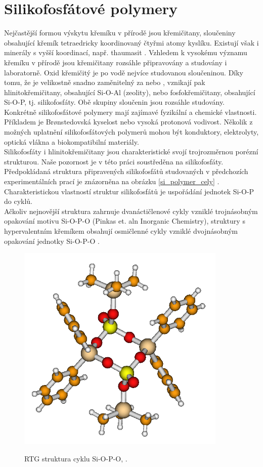 \documentclass[
  digital, %
  table,   %
  lof,     %
  lot,     %
  oneside,
]{fithesis3}
\begin{document}
\section{Silikofosfátové polymery}
Nejčastější formou výskytu křemíku v přírodě jsou křemičitany, sloučeniny obsahující křemík tetraedricky koordinovaný čtyřmi atomy kyslíku. Existují však i minerály s vyšší koordinací, např. thaumasit \cite{Edge:a08100}. Vzhledem k vysokému významu křemíku v přírodě jsou křemičitany rozsáhle připravovány a studovány i laboratorně. Oxid křemičitý  je po vodě nejvíce studovanou sloučeninou. Díky tomu, že  je velikostně snadno zaměnitelný za  nebo , vznikají pak hlinitokřemičitany, obsahující Si-O-Al (zeolity), nebo fosfokřemičitany, obsahující Si-O-P, tj. silikofosfáty. Obě skupiny sloučenin jsou rozsáhle studovány. Konkrétně silikofosfátové polymery mají zajímavé fyzikální a chemické vlastnosti. Příkladem je Brønstedovská kyselost nebo vysoká protonová vodivost. Několik z možných uplatnění silikofosfátových polymerů mohou být konduktory, elektrolyty, optická vlákna a biokompatibilní materiály.\\
Silikofosfáty i hlinitokřemičitany jsou charakteristické svojí trojrozměrnou  porézní strukturou. Naše pozornost je v této práci soustředěna na silikofosfáty. Předpokládaná struktura připravených silikofosfátů studovaných v předchozích experimentálních prací je znázorněna na obrázku \ref{si_polymer_cely} \cite{Styskalik2015thesis}. Charakteristickou vlastností struktur silikofosfátů je uspořádání jednotek Si-O-P do cyklů. \\
Ačkoliv nejnovější struktura zahrnuje dvanáctičlenové cykly vzniklé trojnásobným opakování motivu Si-O-P-O (Pinkas et. aln Inorganic Chemistry), struktury s hypervalentním křemíkem obsahují osmičlenné cykly vzniklé dvojnásobným opakování jednotky Si-O-P-O .
 \begin{figure}[h!]
 \caption{RTG struktura cyklu Si-O-P-O, \cite{C4TA06823H}.}
   \center
   \includegraphics[width=10cm]{rtg_kruh_samostatne.png}
   \label{rtg_cyklus}
   \end{figure}
\end{document}
